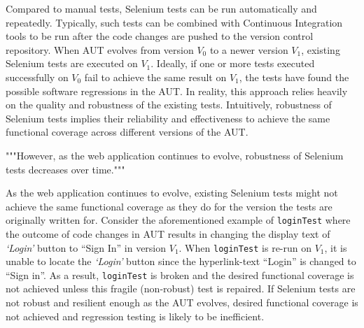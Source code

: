 
  

Compared to manual tests, Selenium tests can be run automatically and repeatedly. Typically, such tests can be combined with Continuous Integration tools to be run after the code changes are pushed to the version control repository. When AUT evolves from version $V_{0}$ to a newer version $V_{1}$, existing Selenium tests are executed on $V_{1}$. Ideally, if one or more tests executed successfully on $V_{0}$ fail to achieve the same result on $V_{1}$, the tests have found the possible software regressions in the AUT. In reality, this approach relies heavily on the quality and robustness of the existing tests. Intuitively, robustness of Selenium tests implies their reliability and effectiveness to achieve the same functional coverage across different versions of the AUT. 

"""However, as the web application continues to evolve, robustness of Selenium tests decreases over time."""

As the web application continues to evolve, existing Selenium tests might not achieve the same functional coverage as they do for the version the tests are originally written for. Consider the aforementioned example of \texttt{loginTest} where the outcome of code changes in AUT results in changing the display text of \textit{`Login'} button to ``Sign In'' in version $V_{1}$. When \texttt{loginTest} is re-run on $V_{1}$, it is unable to locate the \textit{`Login'} button since the hyperlink-text ``Login'' is changed to ``Sign in''. As a result, \texttt{loginTest} is broken and the desired functional coverage is not achieved unless this fragile (non-robust) test is repaired. If Selenium tests are not robust and resilient enough as the AUT evolves, desired functional coverage is not achieved and regression testing is likely to be inefficient.


